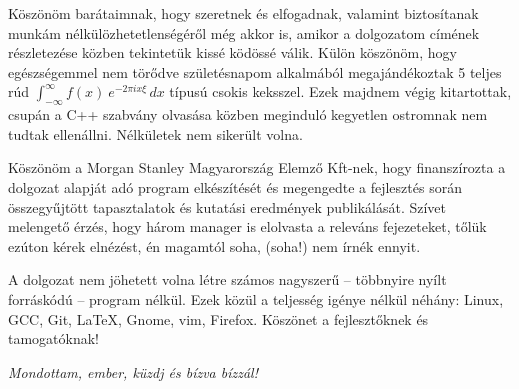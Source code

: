 Köszönöm barátaimnak, hogy szeretnek és elfogadnak, valamint biztosítanak munkám nélkülözhetetlenségéről még akkor is, amikor a dolgozatom címének részletezése közben tekintetük kissé ködössé válik. Külön köszönöm, hogy egészségemmel nem törődve születésnapom alkalmából megajándékoztak 5 teljes rúd $\int_{-\infty}^\infty f(x)\ e^{- 2\pi i x \xi}\,dx$ típusú csokis keksszel. Ezek majdnem végig kitartottak, csupán a C++ szabvány olvasása közben meginduló kegyetlen ostromnak nem tudtak ellenállni. Nélkületek nem sikerült volna.

Köszönöm a Morgan Stanley Magyarország Elemző Kft-nek, hogy finanszírozta a dolgozat alapját adó program elkészítését és megengedte a fejlesztés során összegyűjtött tapasztalatok és kutatási eredmények publikálását. Szívet melengető érzés, hogy három manager is elolvasta a releváns fejezeteket, tőlük ezúton kérek elnézést, én magamtól soha, (soha!) nem írnék ennyit.

A dolgozat nem jöhetett volna létre számos nagyszerű -- többnyire nyílt forráskódú -- program nélkül. Ezek közül a teljesség igénye nélkül néhány: Linux, GCC, Git, \LaTeX, Gnome, vim, Firefox. Köszönet a fejlesztőknek és tamogatóknak!

\vfill
\begin{center}
\emph{Mondottam, ember, küzdj és bízva bízzál!}
\end{center}
\thispagestyle{empty}
